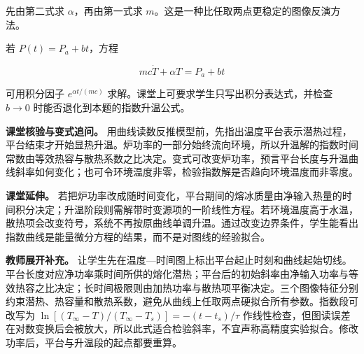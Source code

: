 \documentclass[12pt,a4paper,UTF8]{ctexart}
\begin{document}
先由第二式求 \(\alpha\)，再由第一式求
\(m\)。这是一种比任取两点更稳定的图像反演方法。

若 \(P(t)=P_a+bt\)，方程

\[
mc\dot T+\alpha T=P_a+bt
\]

可用积分因子 \(e^{\alpha t/(mc)}\)
求解。课堂上可要求学生只写出积分表达式，并检查 \(b\to0\)
时能否退化到本题的指数升温公式。

\textbf{课堂核验与变式追问。}
用曲线读数反推模型前，先指出温度平台表示潜热过程，平台结束才开始显热升温。炉功率的一部分始终流向环境，所以升温解的指数时间常数由等效热容与散热系数之比决定。变式可改变炉功率，预言平台长度与升温曲线斜率如何变化；也可令环境温度非零，检验指数解是否趋向环境温度而非零度。

\textbf{课堂延伸。}
若把炉功率改成随时间变化，平台期间的熔冰质量由净输入热量的时间积分决定；升温阶段则需解带时变源项的一阶线性方程。若环境温度高于水温，散热项会改变符号，系统不再按原曲线单调升温。通过改变边界条件，学生能看出指数曲线是能量微分方程的结果，而不是对图线的经验拟合。

\textbf{教师展开补充。}
让学生先在温度---时间图上标出平台起止时刻和曲线起始切线。平台长度对应净功率乘时间所供的熔化潜热；平台后的初始斜率由净输入功率与等效热容之比决定；长时间极限则由加热功率与散热项平衡决定。三个图像特征分别约束潜热、热容量和散热系数，避免从曲线上任取两点硬拟合所有参数。指数段可改写为
\(\ln[(T_\infty-T)/(T_\infty-T_s)]=- (t-t_s)/\tau\)
作线性检查，但图读误差在对数变换后会被放大，所以此式适合检验斜率，不宜声称高精度实验拟合。修改功率后，平台与升温段的起点都要重算。
\end{document}

